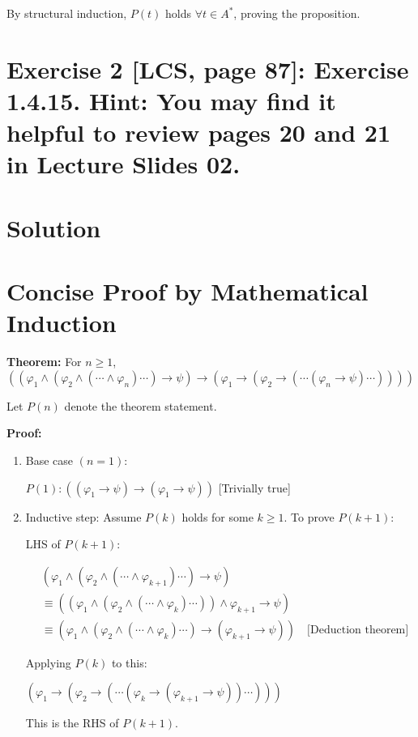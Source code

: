 \documentclass{article}
\begin{document}
By structural induction, $P(t)$ holds $\forall t \in A^*$, proving the proposition.

\newpage

\section*{Exercise 2 [LCS, page 87]: Exercise 1.4.15.
Hint: You may find it helpful to review pages 20 and 21 in Lecture Slides 02.}
\section*{Solution}

\section*{Concise Proof by Mathematical Induction}
\begin{mdframed}
\textbf{Theorem:} For $n \geq 1$, 
\[((\varphi_1 \land (\varphi_2 \land (\cdots\land \varphi_n)\cdots) \to \psi) \to (\varphi_1 \to (\varphi_2 \to (\cdots(\varphi_n \to \psi)\cdots))))\]
\end{mdframed}

Let $P(n)$ denote the theorem statement.

\textbf{Proof:}

\begin{enumerate}
    \item Base case $(n = 1)$:
    \begin{mdframed}
    $P(1): ((\varphi_1 \to \psi) \to (\varphi_1 \to \psi))$ [Trivially true]
    \end{mdframed}

    \item Inductive step:
    Assume $P(k)$ holds for some $k \geq 1$.
    To prove $P(k+1)$:

    LHS of $P(k+1)$:
    \begin{mdframed}
    \begin{align*}
    &(\varphi_1 \land (\varphi_2 \land (\cdots\land \varphi_{k+1})\cdots) \to \psi) \\
    &\equiv ((\varphi_1 \land (\varphi_2 \land (\cdots\land \varphi_k)\cdots)) \land \varphi_{k+1} \to \psi) \\
    &\equiv (\varphi_1 \land (\varphi_2 \land (\cdots\land \varphi_k)\cdots) \to (\varphi_{k+1} \to \psi)) \quad \text{[Deduction theorem]}
    \end{align*}
    \end{mdframed}

    Applying $P(k)$ to this:
    \begin{mdframed}
    $(\varphi_1 \to (\varphi_2 \to (\cdots(\varphi_k \to (\varphi_{k+1} \to \psi))\cdots)))$
    \end{mdframed}

    This is the RHS of $P(k+1)$.
\end{enumerate}
\end{document}
